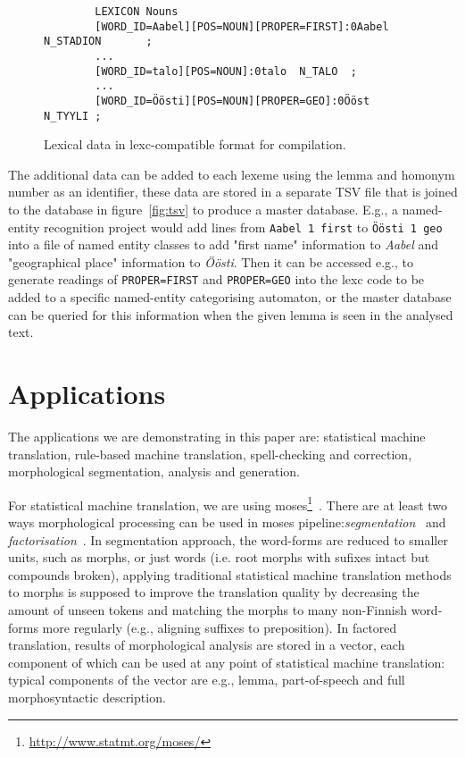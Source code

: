 \documentclass[11pt]{article}
\begin{document}
\begin{figure*}[ht]
    \centering
    \begin{verbatim}
        LEXICON Nouns
        [WORD_ID=Aabel][POS=NOUN][PROPER=FIRST]:0Aabel N_STADION       ;
        ...
        [WORD_ID=talo][POS=NOUN]:0talo  N_TALO  ;
        ...
        [WORD_ID=Öösti][POS=NOUN][PROPER=GEO]:0Ööst  N_TYYLI ;
    \end{verbatim}
    \caption{Lexical data in lexc-compatible format for compilation.
    \label{fig:lexc}}
\end{figure*}

The additional data can be added to each lexeme using
the lemma and homonym number as an identifier, these
data are stored in a separate TSV file that is joined
to the database in figure~\ref{fig:tsv} to produce a
master database. E.g., a named-entity recognition
project would add lines from \texttt{Aabel 1 first}
to \texttt{Öösti 1 geo} into a file of named entity
classes to add "first name" information to
\emph{Aabel} and "geographical place" information to
\emph{Öösti}. Then it can be accessed e.g., to
generate readings of \texttt{PROPER=FIRST} and
\texttt{PROPER=GEO} into the lexc code to be added to
a specific named-entity categorising automaton, or
the master database can be queried for this
information when the given lemma is seen in the
analysed text.


\section{Applications}

The applications we are demonstrating in this paper are:
statistical machine translation, rule-based machine translation,
spell-checking and correction, morphological segmentation, analysis and
generation.

For statistical machine translation, we are using
moses\footnote{\url{http://www.statmt.org/moses/}}~\cite{moses}. There are
at least two ways morphological processing can be used in moses
pipeline:\emph{segmentation}~\cite{dyer2008generalizing} and
\emph{factorisation}~\cite{koehn2007factored}.  In segmentation approach,
the word-forms are reduced to smaller units, such as morphs, or just words
(i.e.  root morphs with sufixes intact but compounds broken), applying
traditional statistical machine translation methods to morphs is supposed to
improve the translation quality by decreasing the amount of unseen tokens
and matching the morphs to many non-Finnish word-forms more regularly (e.g.,
aligning suffixes to preposition). In factored translation, results of
morphological analysis are stored in a vector, each component of which can
be used at any point of statistical machine translation: typical components
of the vector are e.g., lemma, part-of-speech and full morphosyntactic
description.
\end{document}
